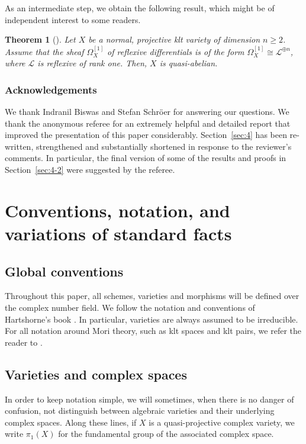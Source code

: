 \documentclass[JEP,XML,SOM,Unicode,published]{cedram}
\let\scr\mathscr
\theoremstyle{plain}
\newtheorem{thm}{Theorem}[section]
\theoremstyle{definition}
\numberwithin{equation}{thm}
\numberwithin{enumi}{thm}
\newcommand{\sL}{\scr{L}}
\begin{document}
As an intermediate step, we obtain the following result, which might be of
independent interest to some readers.

\begin{thm}[]
Let $X$ be a normal, projective klt variety of dimension $n \geq 2$. Assume that
the sheaf $\Omega^{[1]}_X$ of reflexive differentials is of the form
$\Omega^{[1]}_X \cong \sL^{\oplus n}$, where $\sL$ is reflexive of rank one. Then, $X$ is
quasi-abelian.
\end{thm}

\subsubsection*{Acknowledgements}

We thank Indranil Biswas and Stefan Schröer for answering our questions. We
thank the anonymous referee for an extremely helpful and detailed report that
improved the presentation of this paper considerably. Section~\ref{sec:4} has
been re-written, strengthened and substantially shortened in response to the
reviewer's comments. In particular, the final version of some of the results
and proofs in Section~\ref{sec:4-2} were suggested by the referee.

\section{Conventions, notation, and variations of standard facts}

\subsection{Global conventions}

Throughout this paper, all schemes, varieties and morphisms will be defined over
the complex number field. We follow the notation and conventions of
Hartshorne's book \cite{Ha77}. In particular, varieties are always assumed to
be irreducible. For all notation around Mori theory, such as klt spaces and klt
pairs, we refer the reader to \cite{KM98}.

\subsection{Varieties and complex spaces}

In order to keep notation simple, we will sometimes, when there is no danger of
confusion, not distinguish between algebraic varieties and their underlying
complex spaces. Along these lines, if $X$ is a quasi-projective complex
variety, we write $\pi_1(X)$ for the fundamental group of the associated complex
space.
\end{document}
